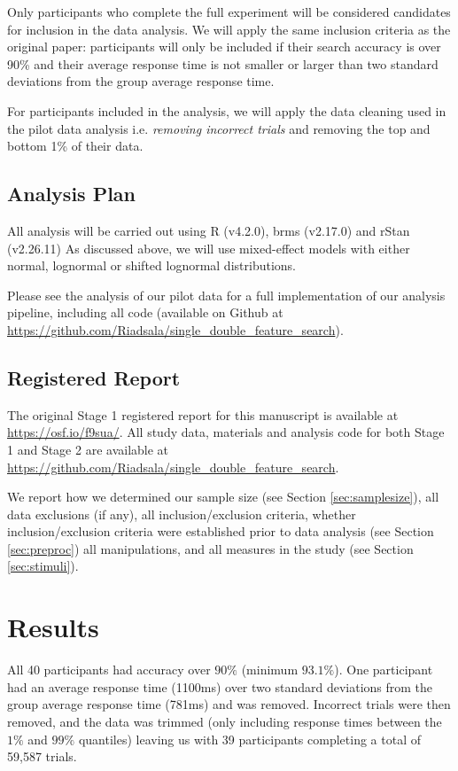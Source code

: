 \documentclass[preprint,12pt,authoryear]{elsarticle}
\begin{document}
Only participants who complete the full experiment will be considered candidates for inclusion in the data analysis. We will apply the same inclusion criteria as the original paper: participants will only be included if their search accuracy is over 90\% and their average response time is not smaller or larger than two standard deviations from the group average response time. 

For participants included in the analysis, we will apply the data cleaning used in the pilot data analysis i.e. \textit{removing incorrect trials} and removing the top and bottom 1\% of their data.

\subsection{Analysis Plan}

All analysis will be carried out using R (v4.2.0), brms (v2.17.0) and rStan (v2.26.11) As discussed above, we will use mixed-effect models with either normal, lognormal or shifted lognormal distributions. 

Please see the analysis of our pilot data for a full implementation of our analysis pipeline, including all code (available on Github at  
\url{https://github.com/Riadsala/single_double_feature_search}).

\subsection{Registered Report}

The original Stage 1 registered report for this manuscript is available at \url{https://osf.io/f9sua/}. All study data, materials and analysis code for both Stage 1 and Stage 2 are available at \url{https://github.com/Riadsala/single_double_feature_search}.

We report how we determined our sample size (see Section \ref{sec:samplesize}), all data exclusions (if any), all inclusion/exclusion criteria, whether inclusion/exclusion criteria were established prior to data analysis (see Section \ref{sec:preproc}) all manipulations, and all measures in the study (see Section \ref{sec:stimuli}). 

\section{Results}

All 40 participants had accuracy over $90\%$ (minimum $93.1\%$). One participant had an average response time (1100ms) over two standard deviations from the group average response time (781ms) and was removed. Incorrect trials were then removed, and the data was trimmed (only including response times between the $1\%$ and $99\%$ quantiles) leaving us with 39 participants completing a total of 59,587 trials.
\end{document}

